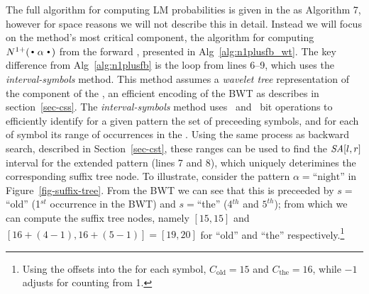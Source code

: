 The full algorithm for computing LM probabilities is given in the \supp as Algorithm 7, however for space reasons we will not describe this in detail.
Instead we will focus on the method's most critical component, the algorithm for computing $\nlplus{\dotpatdot}$ from the forward \CST, presented in Alg~\ref{alg:n1plusfb_wt}.
The key difference from Alg~\ref{alg:n1plusfb} is the loop from lines 6--9, which uses the \emph{interval-symbols} method.
This method assumes a \emph{wavelet tree} representation of the \SA component of the \CST, an efficient encoding of the BWT as describes
in section~\ref{sec-css}.
The \emph{interval-symbols} method uses \rankop~and \selectop~bit operations to efficiently identify for a given pattern the set of preceeding symbols, and for each of symbol its range of occurrences in the \SA.
Using the same process as backward search, described in Section~\ref{sec-cst}, these ranges can be used to find the $\mbox{\emph{SA}}[l,r]$ interval for the extended pattern (lines 7 and 8), which uniquely deterimines the corresponding suffix tree node.
To illustrate, consider the pattern $\alpha=\text{``night''}$ in Figure~\ref{fig-suffix-tree}.
From the BWT we can see that this is preceeded by $s=$``old'' (1$^{st}$ occurrence in the BWT) and $s=$``the'' (4$^{th}$ and $5^{th}$);
from which we can compute the suffix tree nodes, namely
$[15,15]$ and $[16+(4-1),16+(5-1)] = [19,20]$ for ``old'' and ``the'' respectively.\footnote{Using the offsets into the \SA for each symbol, $C_{\text{old}} = 15$ and $C_{\text{the}} = 16$, while $-1$ adjusts for counting from 1.}



